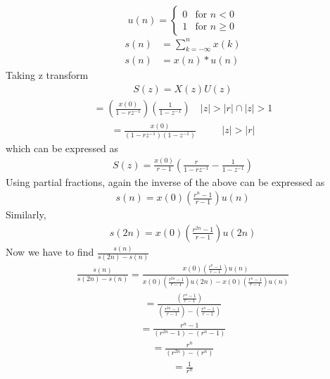 \documentclass[journal,12pt,twocolumn]{IEEEtran}
\theoremstyle{remark}
\begin{document}
\[
u(n) = 
\begin{cases} 
0 & \text{for } n < 0 \\
1 & \text{for } n \geq 0 
\end{cases}
\]
\begin{align}
s(n) &= \sum_{k=-\infty}^{n} x(k) \\
s(n) &= x(n)*u(n)
\end{align}
Taking z transform
\begin{align}
S(z) = X(z)U(z)
\end{align}
\begin{align}
= \left(\frac{x(0)}{1 - rz^{-1}}\right) \left(\frac{1}{1 - z^{-1}}\right)  \quad |z| > |r| \cap |z| > 1
\end{align}
\begin{align}
= \frac{x(0)}{(1 - rz^{-1})(1 - z^{-1})} && \quad |z| > |r|
\end{align}
which can be expressed as
\begin{align}
S(z) = \frac{x(0)}{r-1} \left(\frac{r}{1-rz^{-1}} - \frac{1}{1-z^{-1}}\right)
\end{align}
Using partial fractions, again the inverse of the above can be expressed as 
\begin{align}
s(n) = x(0)\left(\frac{r^{n}-1}{r-1}\right)u(n)
\end{align}
Similarly,
\begin{align}
s(2n) = x(0)\left(\frac{r^{2n}-1}{r-1}\right)u(2n)
\end{align}
Now we have to find $\frac{s(n)}{s(2n)-s(n)}$
\begin{align}
\frac{s(n)}{s(2n)-s(n)} = \frac{x(0)\left(\frac{r^{n}-1}{r-1}\right)u(n)}{x(0)\left(\frac{r^{2n}-1}{r-1}\right)u(2n)- x(0)\left(\frac{r^{n}-1}{r-1}\right)u(n)}
\end{align}
\begin{align}
 = \frac{\left(\frac{r^{n}-1}{r-1}\right)}{\left(\frac{r^{2n}-1}{r-1}\right)- \left(\frac{r^{n}-1}{r-1}\right)}
\end{align}
\begin{align}
= \frac{r^{n}-1}{(r^{2n}-1)- (r^{n}-1)}
\end{align}
\begin{align}
= \frac{r^{n}}{(r^{2n})- (r^{n})}
\end{align}
\begin{align}
= \frac{1}{r^{n}}
\end{align}
\end{document}
